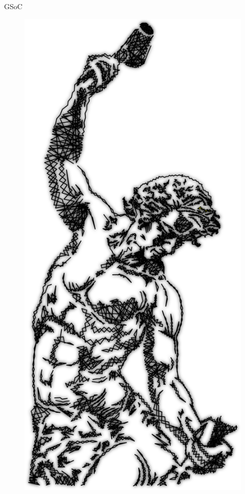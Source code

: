 \documentclass[10pt, compress, aspectratio=169]{beamer}
\begin{document}
\begin{frame}{GSoC}
  \begin{figure}
    \centering
    \includegraphics[width=\linewidth,
                     height=0.8\textheight,
                     keepaspectratio]{self_made2}
  \end{figure}
\end{frame}
\end{document}
